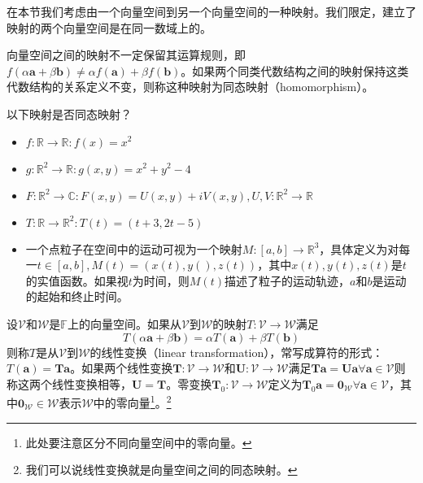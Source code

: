 \documentclass[main.tex]{subfiles}
\begin{document}
在本节我们考虑由一个向量空间到另一个向量空间的一种映射。我们限定，建立了映射的两个向量空间是在同一数域上的。

向量空间之间的映射不一定保留其运算规则，即$f\left(\alpha\mathbf{a}+\beta\mathbf{b}\right)\neq\alpha f\left(\mathbf{a}\right)+\beta f\left(\mathbf{b}\right)$。如果两个同类代数结构之间的映射保持这类代数结构的关系定义不变，则称这种映射为同态映射（homomorphism）。
\begin{example}
以下映射是否同态映射？
\begin{itemize}
    \item $f:\mathbb{R}\rightarrow\mathbb{R}:f\left(x\right)=x^2$
    \item $g:\mathbb{R}^2\rightarrow\mathbb{R}:g\left(x,y\right)=x^2+y^2-4$
    \item $F:\mathbb{R}^2\rightarrow\mathbb{C}:F\left(x,y\right)=U\left(x,y\right)+iV\left(x,y\right),U,V:\mathbb{R}^2\rightarrow\mathbb{R}$
    \item $T:\mathbb{R}\rightarrow\mathbb{R}^2:T\left(t\right)=\left(t+3,2t-5\right)$
    \item 一个点粒子在空间中的运动可视为一个映射$M:\left[a,b\right]\rightarrow\mathbb{R}^3$，具体定义为对每一$t\in\left[a,b\right],M\left(t\right)=\left(x\left(t\right),y\left(\right),z\left(t\right)\right)$，其中$x\left(t\right),y\left(t\right),z\left(t\right)$是$t$的实值函数。如果视$t$为时间，则$M\left(t\right)$描述了粒子的运动轨迹，$a$和$b$是运动的起始和终止时间。
\end{itemize}
\end{example}

\begin{definition}[线性变换]\label{def:II.4.1}
设$\mathcal{V}$和$\mathcal{W}$是$\mathbb{F}$上的向量空间。如果从$\mathcal{V}$到$\mathcal{W}$的映射$T:\mathcal{V}\rightarrow\mathcal{W}$满足
\[T\left(\alpha\mathbf{a}+\beta\mathbf{b}\right)=\alpha T\left(\mathbf{a}\right)+\beta T\left(\mathbf{b}\right)\]
则称$T$是从$\mathcal{V}$到$\mathcal{W}$的线性变换（linear transformation），常写成算符的形式：$T\left(\mathbf{a}\right)=\mathbf{Ta}$。如果两个线性变换$\mathbf{T}:\mathcal{V}\rightarrow\mathcal{W}$和$\mathbf{U}:\mathcal{V}\rightarrow\mathcal{W}$满足$\mathbf{Ta}=\mathbf{Ua}\forall\mathbf{a}\in\mathcal{V}$则称这两个线性变换相等，$\mathbf{U}=\mathbf{T}$。零变换$\mathbf{T}_0:\mathcal{V}\rightarrow\mathcal{W}$定义为$\mathbf{T}_0\mathbf{a}=\mathbf{0}_\mathcal{W}\forall\mathbf{a}\in\mathcal{V}$，其中$\mathbf{0}_\mathcal{W}\in\mathcal{W}$表示$\mathcal{W}$中的零向量\footnote{此处要注意区分不同向量空间中的零向量。}。\footnote{我们可以说线性变换就是向量空间之间的同态映射。}
\end{definition}
\end{document}
